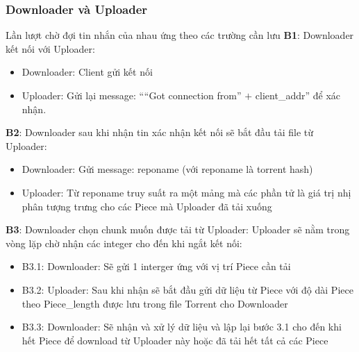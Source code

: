 \documentclass[a4paper]{article}
\begin{document}
        \subsubsection{Downloader và Uploader} Lần lượt chờ đợi tin nhắn của nhau ứng theo các trường cần lưu
        \newline
        \newline
            \textbf{B1}: Downloader kết nối với Uploader:
                \begin{itemize}
                    \item Downloader: Client gửi kết nối
                    \item Uploader: Gửi lại message: \textquotedblleft\textquotedblleft Got connection from\textquotedblright{} $+$ client\_addr\textquotedblright{} để xác nhận.
                \end{itemize}
            \textbf{B2}: Downloader sau khi nhận tin xác nhận kết nối sẽ bắt đầu tải file từ Uploader:
                \begin{itemize}
                    \item Downloader: Gửi message: reponame (với reponame là torrent hash)
                    \item Uploader: Từ reponame truy suất ra một mảng mà các phần tử là giá trị nhị phân tượng trưng cho các Piece mà Uploader đã tải xuống
                \end{itemize}
            \textbf{B3}: Downloader chọn chunk muốn được tải từ Uploader:
                Uploader sẽ nằm trong vòng lặp chờ nhận các integer cho đến khi ngắt kết nối:
                \begin{itemize}
                    \item B3.1: Downloader: Sẽ gửi 1 interger ứng với vị trí Piece cần tải
                    \item B3.2: Uploader: Sau khi nhận sẽ bắt đầu gửi dữ liệu từ Piece với độ dài Piece theo Piece\_length được lưu trong file Torrent cho Downloader
                    \item B3.3: Downloader: Sẽ nhận và xử lý dữ liệu và lập lại bước 3.1 cho đến khi hết Piece để download từ Uploader này hoặc đã tải hết tất cả các Piece
                \end{itemize}
\end{document}
